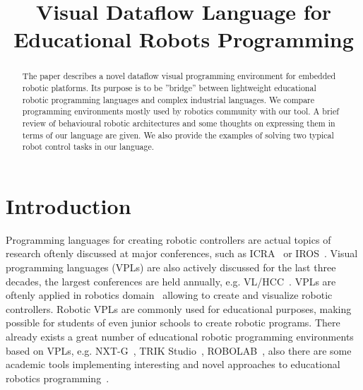 \documentclass[conference,compsoc]{IEEEtran}
\begin{document}
\title{Visual Dataflow Language for Educational Robots Programming}

\author{
	\and

}

\maketitle



\begin{abstract}
The paper describes a novel dataflow visual programming environment for embedded robotic platforms. Its purpose is to be ''bridge'' between lightweight educational robotic programming languages and complex industrial languages. We compare programming environments mostly used by robotics community with our tool. A brief review of behavioural robotic architectures and some thoughts on expressing them in terms of our language are given. We also provide the examples of solving two typical robot control tasks in our language.
\end{abstract}

\section{Introduction}

Programming languages for creating robotic controllers are actual topics of research oftenly discussed at major conferences, such as ICRA~\cite{Icra} or IROS~\cite{Iros2016}. Visual programming languages (VPLs) are also actively discussed for the last three decades, the largest conferences are held annually, e.g. VL/HCC~\cite{VLHCC}. VPLs are oftenly applied in robotics domain~\cite{banyasad2000visual,simpson2006mobile,simpson2008visual,posso2011process,diprose2011ruru} allowing to create and visualize robotic controllers. Robotic VPLs are commonly used for educational purposes, making possible for students of even junior schools to create robotic programs. There already exists a great number of educational robotic programming environments based on VPLs, e.g. NXT-G~\cite{nxtg}, TRIK Studio~\cite{trik}, ROBOLAB~\cite{robolab}, also there are some academic tools implementing interesting and novel approaches to educational robotics programming~\cite{banyasad2000visual,simpson2008visual,diprose2011ruru}.
\end{document}
